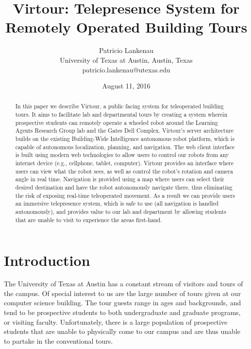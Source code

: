 \documentclass[
  oneside,
  11pt, a4paper,
  footinclude=true,
  headinclude=true,
  cleardoublepage=empty
]{article}
\title{Virtour: Telepresence System for Remotely Operated Building Tours}
\author{Patricio Lankenau\\
        University of Texas at Austin, Austin, Texas\\
        patricio.lankenau@utexas.edu\\}
\date{August 11, 2016}
\begin{document}
\maketitle

\begin{abstract}
  In this paper we describe Virtour, a public facing system for teleoperated
  building tours. It aims to facilitate lab and departmental tours by creating
  a system wherein prospective students can remotely operate a wheeled robot
  around the Learning Agents Research Group lab and the Gates Dell Complex.
  Virtour's server architecture builds on the existing Building-Wide
  Intelligence autonomous robot platform, which is capable of autonomous
  localization, planning, and navigation. The web client interface is built
  using modern web technologies to allow users to control our robots from any
  internet device (e.g., cellphone, tablet, computer). Virtour provides an
  interface where users can view what the robot sees, as well as control the
  robot's rotation and camera angle in real time. Navigation is provided using
  a map where users can select their desired destination and have the robot
  autonomously navigate there, thus eliminating the risk of exposing real-time
  teleoperated movement. As a result we can provide users an immersive
  telepresence system, which is safe to use (all navigation is handled
  autonomously), and provides value to our lab and department by allowing
  students that are unable to visit to experience the areas first-hand.
\end{abstract}

\newpage

\section{Introduction}\label{sec:intro}

The University of Texas at Austin has a constant stream of visitors and tours
of the campus. Of special interest to us are the large number of tours given at
our computer science building. The tour guests range in ages and backgrounds,
and tend to be prospective students to both undergraduate and graduate programs,
or visiting faculty. Unfortunately, there is a large population of prospective
students that are unable to physically come to our campus and are thus unable
to partake in the conventional tours.
\end{document}
